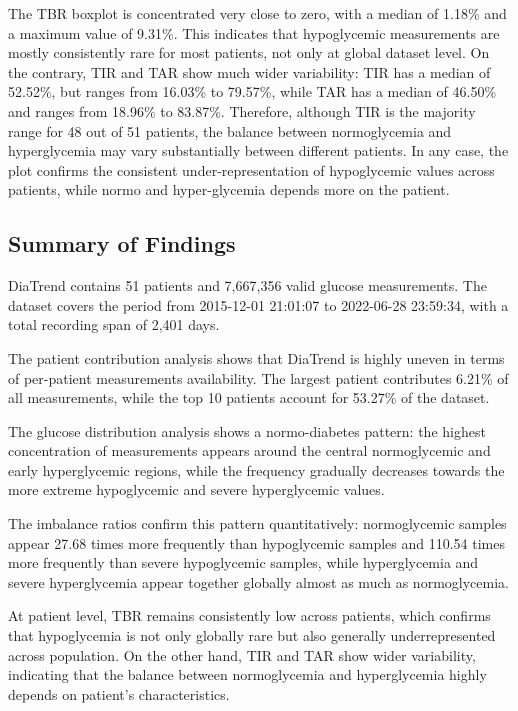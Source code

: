 The TBR boxplot is concentrated very close to zero, with a median of 1.18\% and a maximum value of 9.31\%. This indicates that hypoglycemic measurements are mostly consistently rare for most patients, not only at global dataset level. On the contrary, TIR and TAR show much wider variability: TIR has a median of 52.52\%, but ranges from 16.03\% to 79.57\%, while TAR has a median of 46.50\% and ranges from 18.96\% to 83.87\%. Therefore, although TIR is the majority range for 48 out of 51 patients, the balance between normoglycemia and hyperglycemia may vary substantially between different patients. In any case, the plot confirms the consistent under-representation of hypoglycemic values across patients, while normo and hyper-glycemia depends more on the patient.

\subsection{Summary of Findings}
\label{subsec:diatrend_summary}

DiaTrend contains 51 patients and 7,667,356 valid glucose measurements. The dataset covers the period from 2015-12-01 21:01:07 to 2022-06-28 23:59:34, with a total recording span of 2,401 days.

The patient contribution analysis shows that DiaTrend is highly uneven in terms of per-patient measurements availability. The largest patient contributes 6.21\% of all measurements, while the top 10 patients account for 53.27\% of the dataset.

The glucose distribution analysis shows a normo-diabetes pattern: the highest concentration of measurements appears around the central normoglycemic and early hyperglycemic regions, while the frequency gradually decreases towards the more extreme hypoglycemic and severe hyperglycemic values.

The imbalance ratios confirm this pattern quantitatively: normoglycemic samples appear 27.68 times more frequently than hypoglycemic samples and 110.54 times more frequently than severe hypoglycemic samples, while hyperglycemia and severe hyperglycemia appear together globally almost as much as normoglycemia.

At patient level, TBR remains consistently low across patients, which confirms that hypoglycemia is not only globally rare but also generally underrepresented across population. On the other hand, TIR and TAR show wider variability, indicating that the balance between normoglycemia and hyperglycemia highly depends on patient's characteristics.